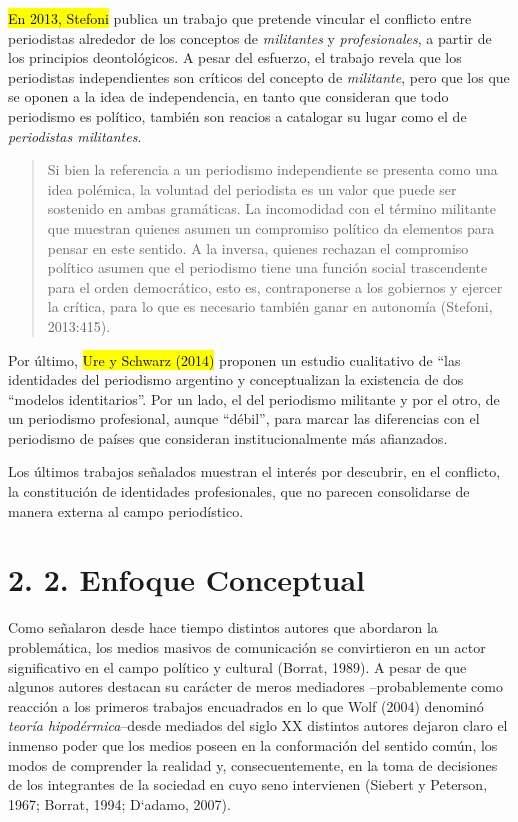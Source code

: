 \hl{En 2013, Stefoni} publica un trabajo que pretende vincular el conflicto entre periodistas alrededor de los conceptos de \emph{militantes} y \emph{profesionales}, a partir de los principios deontológicos. A pesar del esfuerzo, el trabajo revela que los periodistas independientes son críticos del concepto de \emph{militante}, pero que los que se oponen a la idea de independencia, en tanto que consideran que todo periodismo es político, también son reacios a catalogar su lugar como el de \emph{periodistas militantes}.

\begin{quote}
Si bien la referencia a un periodismo independiente se presenta como una idea polémica, la voluntad del periodista es un valor que puede ser sostenido en ambas gramáticas. La incomodidad con el término militante que muestran quienes asumen un compromiso político da elementos para pensar en este sentido. A la inversa, quienes rechazan el compromiso político asumen que el periodismo tiene una función social trascendente para el orden democrático, esto es, contraponerse a los gobiernos y ejercer la crítica, para lo que es necesario también ganar en autonomía (Stefoni, 2013:415).
\end{quote}

Por último, \hl{Ure y Schwarz (2014)} proponen un estudio cualitativo de ``las identidades del periodismo argentino y conceptualizan la existencia de dos ``modelos identitarios''. Por un lado, el del periodismo militante y por el otro, de un periodismo profesional, aunque ``débil'', para marcar las diferencias con el periodismo de países que consideran institucionalmente más afianzados.

Los últimos trabajos señalados muestran el interés por descubrir, en el conflicto, la constitución de identidades profesionales, que no parecen consolidarse de manera externa al campo periodístico.

\section{2. 2. Enfoque Conceptual}

Como señalaron desde hace tiempo distintos autores que abordaron la problemática, los medios masivos de comunicación se convirtieron en un actor significativo en el campo político y cultural (Borrat, 1989). A pesar de que algunos autores destacan su carácter de meros mediadores --probablemente como reacción a los primeros trabajos encuadrados en lo que Wolf (2004) denominó \emph{teoría hipodérmica}--desde mediados del siglo XX distintos autores dejaron claro el inmenso poder que los medios poseen en la conformación del sentido común, los modos de comprender la realidad y, consecuentemente, en la toma de decisiones de los integrantes de la sociedad en cuyo seno intervienen (Siebert y Peterson, 1967; Borrat, 1994; D`adamo, 2007).

